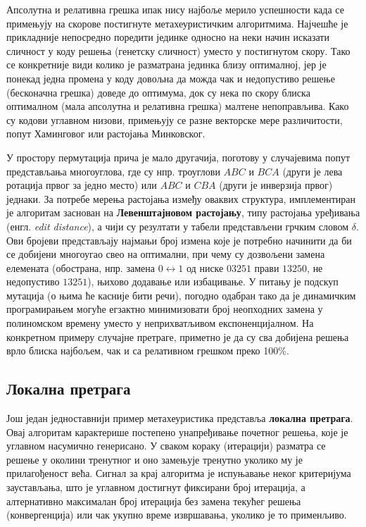 \documentclass[a4paper]{article}
\begin{document}
Апсолутна и релативна грешка ипак нису најбоље мерило успешности када се примењују на скорове постигнуте метахеуристичким алгоритмима. Најчешће је прикладније непосредно поредити јединке односно на неки начин исказати сличност у коду решења (генетску сличност) уместо у постигнутом скору. Тако се конкретније види колико је разматрана јединка близу оптималној, јер је понекад једна промена у коду довољна да можда чак и недопустиво решење (бесконачна грешка) доведе до оптимума, док су нека по скору блиска оптималном (мала апсолутна и релативна грешка) малтене непоправљива. Како су кодови углавном низови, примењују се разне векторске мере различитости, попут Хаминговог или растојања Минковског.

У простору пермутација прича је мало другачија, поготову у случајевима попут представљања многоуглова, где су нпр. троуглови $ABC$ и $BCA$ (други је лева ротација првог за једно место) или $ABC$ и $CBA$ (други је инверзија првог) једнаки. За потребе мерења растојања између оваквих структура, имплементиран је алгоритам заснован на \textbf{Левенштајновом растојању}, типу растојања уређивања (енгл. \textit{edit distance}), а чији су резултати у табели представљени грчким словом $\delta$. Ови бројеви представљају најмањи број измена које је потребно начинити да би се добијени многоугао свео на оптимални, при чему су дозвољени замена елемената (обострана, нпр. замена $0 \leftrightarrow 1$ од ниске $03251$ прави $13250$, не недопустиво $13251$), њихово додавање или избацивање. У питању је подскуп мутација (о њима ће касније бити речи), погодно одабран тако да је динамичким програмирањем могуће егзактно минимизовати број неопходних замена у полиномском времену уместо у неприхватљивом експоненцијалном. На конкретном примеру случајне претраге, приметно је да су сва добијена решења врло блиска најбољем, чак и са релативном грешком преко 100\%.

\subsection{Локална претрага}

Још један једноставнији пример метахеуристика представља \textbf{локална претрага}. Овај алгоритам карактерише постепено унапређивање почетног решења, које је углавном насумично генерисано. У сваком кораку (итерацији) разматра се решење у околини тренутног и оно замењује тренутно уколико му је прилагођеност већа. Сигнал за крај алгоритма је испуњавање неког критеријума заустављања, што је углавном достигнут фиксирани број итерација, а алтернативно максималан број итерација без замена текућег решења (конвергенција) или чак укупно време извршавања, уколико је то применљиво.
\end{document}
